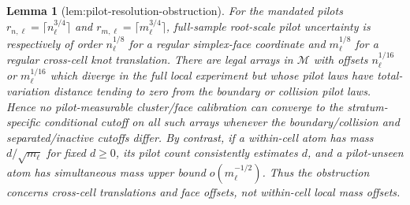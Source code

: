 \documentclass{article}
\newtheorem{lemma}{Lemma}
\begin{document}
\begin{lemma}[lem:pilot-resolution-obstruction]\label{lem:pilot-resolution-obstruction}
For the mandated pilots \(r_{n,\ell}=\lceil n_\ell^{3/4}\rceil\) and \(r_{m,\ell}=\lceil m_\ell^{3/4}\rceil\), full-sample root-scale pilot uncertainty is respectively of order \(n_\ell^{1/8}\) for a regular simplex-face coordinate and \(m_\ell^{1/8}\) for a regular cross-cell knot translation.  There are legal arrays in \(\mathcal M\) with offsets \(n_\ell^{1/16}\) or \(m_\ell^{1/16}\) which diverge in the full local experiment but whose pilot laws have total-variation distance tending to zero from the boundary or collision pilot laws.  Hence no pilot-measurable cluster/face calibration can converge to the stratum-specific conditional cutoff on all such arrays whenever the boundary/collision and separated/inactive cutoffs differ.  By contrast, if a within-cell atom has mass \(d/\sqrt{m_\ell}\) for fixed \(d\geq0\), its pilot count consistently estimates \(d\), and a pilot-unseen atom has simultaneous mass upper bound \(o(m_\ell^{-1/2})\).  Thus the obstruction concerns cross-cell translations and face offsets, not within-cell local mass offsets.
\end{lemma}
\end{document}
